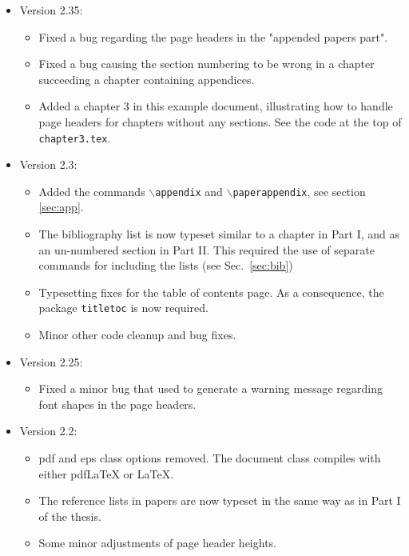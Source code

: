 \begin{itemize}
    \item Version 2.35:
        \begin{itemize}
				\item Fixed a bug regarding the page headers in the "appended papers part".
				\item Fixed a bug causing the section numbering to be wrong in a chapter succeeding a chapter containing appendices.
			   \item Added a chapter 3 in this example document, illustrating how to handle page headers for chapters without any sections. See the code at the top of \texttt{chapter3.tex}.
		  \end{itemize}
    \item Version 2.3:
        \begin{itemize}
            \item Added the commands \texttt{$\backslash$appendix}
            and \texttt{$\backslash$paperappendix}, see section
            \ref{sec:app}.
            \item The bibliography list is now typeset similar to a
            chapter in Part I, and as an un-numbered section in Part
            II. This required the use of separate commands for
            including the lists (see Sec.~\ref{sec:bib})
            \item Typesetting fixes for the table of contents page.
            As a consequence, the package \texttt{titletoc} is now
            required.
            \item Minor other code cleanup and bug fixes.
        \end{itemize}
    \item Version 2.25:
    \begin{itemize}
        \item Fixed a minor bug that used to generate a warning
        message regarding font shapes in the page headers.
    \end{itemize}
    \item Version 2.2:
    \begin{itemize}
        \item pdf and eps class options removed. The document class
        compiles with either pdfLaTeX or \LaTeX.
        \item The reference lists in papers are now typeset in the
        same way as in Part I of the thesis.
        \item Some minor adjustments of page header heights.
    \end{itemize}

\end{itemize}

